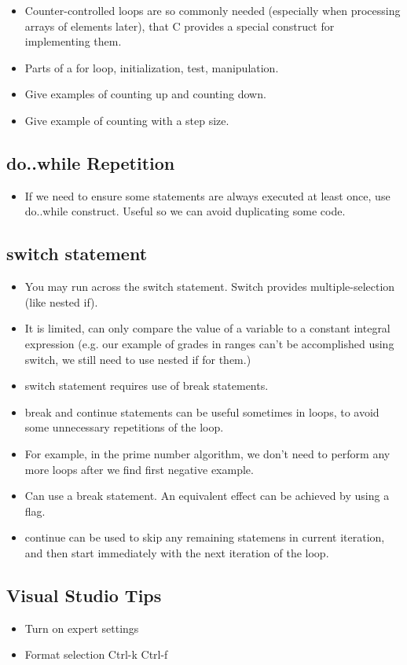 \documentclass[11pt]{article}
\begin{document}
\begin{itemize}
\item Counter-controlled loops are so commonly needed (especially when
  processing arrays of elements later), that C provides a special
  construct for implementing them.
\item Parts of a for loop, initialization, test, manipulation.
\item Give examples of counting up and counting down.
\item Give example of counting with a step size.
\end{itemize}
\subsection{do..while Repetition}
\label{sec-3-2}

\begin{itemize}
\item If we need to ensure some statements are always executed at least
  once, use do..while construct.  Useful so we can avoid duplicating
  some code.
\end{itemize}
\subsection{switch statement}
\label{sec-3-3}

\begin{itemize}
\item You may run across the switch statement.  Switch provides multiple-selection (like nested if).
\item It is limited, can only compare the value of a variable to a
  constant integral expression (e.g. our example of grades in ranges
  can't be accomplished using switch, we still need to use nested if
  for them.)
\item switch statement requires use of break statements.
\item break and continue statements can be useful sometimes in loops, to
  avoid some unnecessary repetitions of the loop.
\item For example, in the prime number algorithm, we don't need to perform
  any more loops after we find first negative example.
\item Can use a break statement.  An equivalent effect can be achieved by using a flag.
\item continue can be used to skip any remaining statemens in current
  iteration, and then start immediately with the next iteration of the
  loop.
\end{itemize}
\subsection{Visual Studio Tips}
\label{sec-3-4}

\begin{itemize}
\item Turn on expert settings
\item Format selection Ctrl-k Ctrl-f
\end{itemize}
\end{document}
